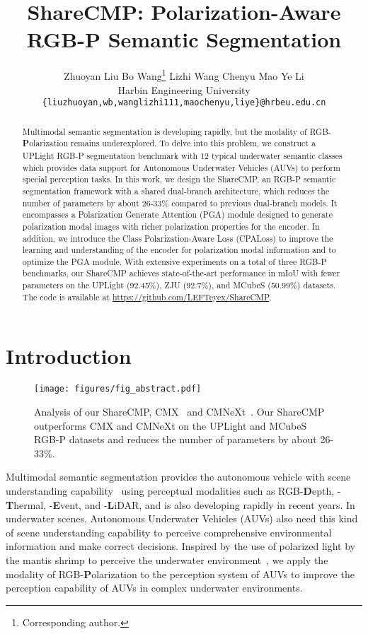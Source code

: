 \documentclass[10pt,twocolumn,letterpaper]{article}
\title{ShareCMP: Polarization-Aware RGB-P Semantic Segmentation}
\author{
Zhuoyan Liu \quad Bo Wang\thanks{Corresponding author.} \quad Lizhi Wang \quad Chenyu Mao \quad Ye Li \\
Harbin Engineering University\\
{\tt\small \{liuzhuoyan,wb,wanglizhi111,maochenyu,liye\}@hrbeu.edu.cn}
}
\begin{document}
\maketitle
\begin{abstract}
Multimodal semantic segmentation is developing rapidly, but the modality of RGB-\textbf{P}olarization remains underexplored. To delve into this problem, we construct a UPLight RGB-P segmentation benchmark with 12 typical underwater semantic classes which provides data support for Autonomous Underwater Vehicles (AUVs) to perform special perception tasks. In this work, we design the ShareCMP, an RGB-P semantic segmentation framework with a shared dual-branch architecture, which reduces the number of parameters by about 26-33\% compared to previous dual-branch models. It encompasses a Polarization Generate Attention (PGA) module designed to generate polarization modal images with richer polarization properties for the encoder. In addition, we introduce the Class Polarization-Aware Loss (CPALoss) to improve the learning and understanding of the encoder for polarization modal information and to optimize the PGA module. With extensive experiments on a total of three RGB-P benchmarks, our ShareCMP achieves state-of-the-art performance in mIoU with fewer parameters on the UPLight (92.45\%), ZJU (92.7\%), and MCubeS (50.99\%) datasets. The code is available at \url{https://github.com/LEFTeyex/ShareCMP}.
\end{abstract} \section{Introduction}
\label{sec:introduction}


\begin{figure}[t]
  \centering
   \texttt{[image: figures/fig\_abstract.pdf]}
   \caption{Analysis of our ShareCMP, CMX~\cite{cmx} and CMNeXt~\cite{cmnext}. Our ShareCMP outperforms CMX and CMNeXt on the UPLight and MCubeS~\cite{mcubes} RGB-P datasets and reduces the number of parameters by about 26-33\%.}
   \label{fig:abstract}
\end{figure} 

Multimodal semantic segmentation provides the autonomous vehicle with scene understanding capability~\cite{30,51} using perceptual modalities such as RGB-\textbf{D}epth, -\textbf{T}hermal, -\textbf{E}vent, and -\textbf{L}iDAR, and is also developing rapidly in recent years. In underwater scenes, Autonomous Underwater Vehicles (AUVs) also need this kind of scene understanding capability to perceive comprehensive environmental information and make correct decisions. Inspired by the use of polarized light by the mantis shrimp to perceive the underwater environment~\cite{52,53}, we apply the modality of RGB-\textbf{P}olarization to the perception system of AUVs to improve the perception capability of AUVs in complex underwater environments.
\end{document}
